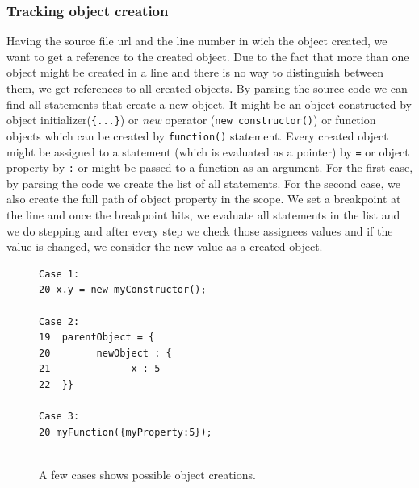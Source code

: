 \documentclass[preprint]{sigplanconf}
\begin{document}
\subsubsection{Tracking object creation}
Having the source file url and the line number in wich the object created, we want to get a reference to the created object. Due to the fact that more than one object might be created in a line and there is no way to distinguish between them, we get references to all created objects. 
By parsing the source code we can find all statements that create a new object. It might be an object constructed by object initializer(\texttt{\{...\}}) or \textit{new} operator (\texttt{new constructor()}) or function objects which can be created by \texttt{function()} statement.
Every created object might be assigned to a statement (which is evaluated as a pointer) by \texttt{=} or object property by \texttt{:} or might be passed to a function as an argument.
For the first case, by parsing the code we create the list of all statements. For the second case, we also create the full path of object property in the scope.
We set a breakpoint at the line and once the breakpoint hits, we evaluate all statements in the list and we do stepping and after every step we check those assignees values and if the value is changed, we consider the new value as a created object.

 
 

\begin{figure}[htp]
\begin{verbatim}
Case 1:
20 x.y = new myConstructor();

Case 2:
19  parentObject = {
20   	  newObject : {
21  			x : 5
22  }}

Case 3:
20 myFunction({myProperty:5});
 
\end{verbatim}
\caption{A few cases shows possible object creations.}
\label{fig:objectCreation}
\end{figure}
\end{document}
